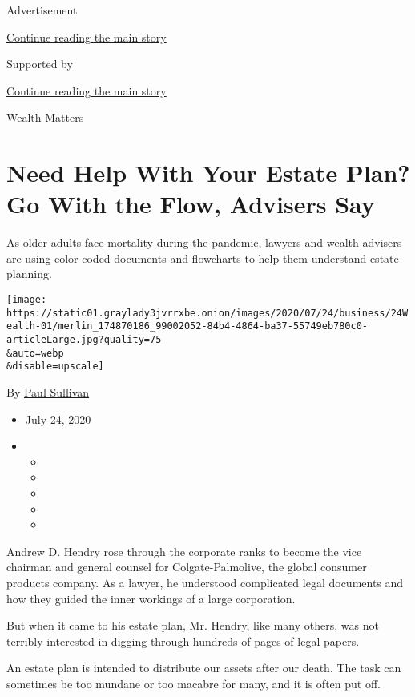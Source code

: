 Advertisement

\protect\hyperlink{after-top}{Continue reading the main story}

Supported by

\protect\hyperlink{after-sponsor}{Continue reading the main story}

Wealth Matters

\hypertarget{need-help-with-your-estate-plan-go-with-the-flow-advisers-say}{%
\section{Need Help With Your Estate Plan? Go With the Flow, Advisers
Say}\label{need-help-with-your-estate-plan-go-with-the-flow-advisers-say}}

As older adults face mortality during the pandemic, lawyers and wealth
advisers are using color-coded documents and flowcharts to help them
understand estate planning.

\texttt{[image: https://static01.graylady3jvrrxbe.onion/images/2020/07/24/business/24Wealth-01/merlin\_174870186\_99002052-84b4-4864-ba37-55749eb780c0-articleLarge.jpg?quality=75\\\&auto=webp\\\&disable=upscale]}

By \href{https://www.nytimes3xbfgragh.onion/by/paul-sullivan}{Paul
Sullivan}

\begin{itemize}
\item
  July 24, 2020
\item
  \begin{itemize}
  \item
  \item
  \item
  \item
  \item
  \end{itemize}
\end{itemize}

Andrew D. Hendry rose through the corporate ranks to become the vice
chairman and general counsel for Colgate-Palmolive, the global consumer
products company. As a lawyer, he understood complicated legal documents
and how they guided the inner workings of a large corporation.

But when it came to his estate plan, Mr. Hendry, like many others, was
not terribly interested in digging through hundreds of pages of legal
papers.

An estate plan is intended to distribute our assets after our death. The
task can sometimes be too mundane or too macabre for many, and it is
often put off.

